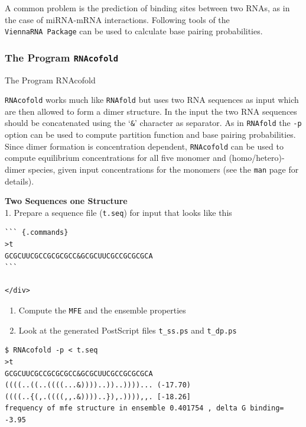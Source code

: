 \documentclass[]{article}
\providecommand{\tightlist}{%
  \setlength{\itemsep}{0pt}\setlength{\parskip}{0pt}}
\begin{document}
A common problem is the prediction of binding sites between two RNAs, as
in the case of miRNA-mRNA interactions. Following tools of the
\texttt{ViennaRNA\ Package} can be used to calculate base pairing
probabilities.

\subsubsection{The Program \texttt{RNAcofold}}{The Program RNAcofold}\label{the-program-rnacofold}

\texttt{RNAcofold} works much like \texttt{RNAfold} but uses two RNA
sequences as input which are then allowed to form a dimer structure. In
the input the two RNA sequences should be concatenated using the
`\texttt{\&}' character as separator. As in \texttt{RNAfold} the
\texttt{-p} option can be used to compute partition function and base
pairing probabilities.\\
Since dimer formation is concentration dependent, \texttt{RNAcofold} can
be used to compute equilibrium concentrations for all five monomer and
(homo/hetero)-dimer species, given input concentrations for the monomers
(see the \texttt{man} page for details).

\textbf{Two Sequences one Structure}\\
1. Prepare a sequence file (\texttt{t.seq}) for input that looks like
this

\begin{verbatim}
``` {.commands}
>t
GCGCUUCGCCGCGCGCC&GCGCUUCGCCGCGCGCA
```

</div>
\end{verbatim}

\begin{enumerate}
\def\labelenumi{\arabic{enumi}.}
\setcounter{enumi}{1}
\tightlist
\item
  Compute the \texttt{MFE} and the ensemble properties
\item
  Look at the generated PostScript files \texttt{t\_ss.ps} and
  \texttt{t\_dp.ps}
\end{enumerate}

\begin{verbatim}
$ RNAcofold -p < t.seq
>t
GCGCUUCGCCGCGCGCC&GCGCUUCGCCGCGCGCA
((((..((..((((...&))))..))..))))... (-17.70)
((((..{(,.((((,,.&))))..}),.)))),,. [-18.26]
frequency of mfe structure in ensemble 0.401754 , delta G binding= -3.95
\end{verbatim}
\end{document}
